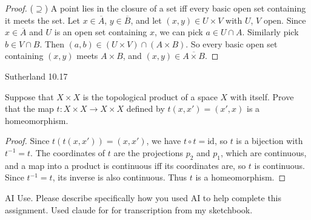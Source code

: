 \documentclass[minion]{homework}
\begin{document}
\begin{problems}
\begin{proof}
($\supseteq$) A point lies in the closure of a set iff every basic open set containing it meets the set. Let $x \in \overline{A}$, $y \in \overline{B}$, and let $(x,y) \in U \times V$ with $U$, $V$ open. Since $x \in \overline{A}$ and $U$ is an open set containing $x$, we can pick $a \in U \cap A$. Similarly pick $b \in V \cap B$. Then $(a,b) \in (U \times V) \cap (A \times B)$. So every basic open set containing $(x,y)$ meets $A \times B$, and $(x,y) \in \overline{A \times B}$.
\end{proof}

\problem Sutherland 10.17

Suppose that $X \times X$ is the topological product of a space $X$ with itself. Prove that the map $t : X \times X \to X \times X$ defined by $t(x, x') = (x', x)$ is a homeomorphism.

\begin{proof}
Since $t(t(x,x')) = (x,x')$, we have $t \circ t = \mathrm{id}$, so $t$ is a bijection with $t^{-1} = t$. The coordinates of $t$ are the projections $p_2$ and $p_1$, which are continuous, and a map into a product is continuous iff its coordinates are, so $t$ is continuous. Since $t^{-1} = t$, its inverse is also continuous. Thus $t$ is a homeomorphism.
\end{proof}

\problem AI Use. Please describe specifically how you used AI to help complete this assignment.
\newline
Used claude for for transcription from my sketchbook.
\end{problems}
\end{document}
